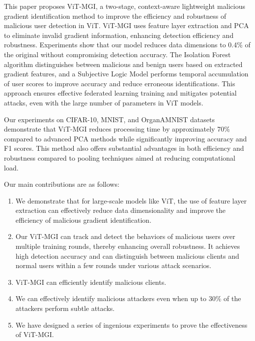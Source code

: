 \documentclass[conference]{IEEEtran}
\begin{document}
This paper proposes ViT-MGI, a two-stage, context-aware lightweight malicious gradient identification method to improve the efficiency and robustness of malicious user detection in ViT. ViT-MGI uses feature layer extraction and PCA to eliminate invalid gradient information, enhancing detection efficiency and robustness. Experiments show that our model reduces data dimensions to 0.4\% of the original without compromising detection accuracy. The Isolation Forest algorithm distinguishes between malicious and benign users based on extracted gradient features, and a Subjective Logic Model performs temporal accumulation of user scores to improve accuracy and reduce erroneous identifications. This approach ensures effective federated learning training and mitigates potential attacks, even with the large number of parameters in ViT models.

Our experiments on CIFAR-10, MNIST, and OrganAMNIST datasets demonstrate that ViT-MGI reduces processing time by approximately 70\% compared to advanced PCA methods while significantly improving accuracy and F1 scores. This method also offers substantial advantages in both efficiency and robustness compared to pooling techniques aimed at reducing computational load.

Our main contributions are as follows:


\begin{enumerate}
    \item We demonstrate that for large-scale models like ViT, the use of feature layer extraction can effectively reduce data dimensionality and improve the efficiency of malicious gradient identification.
    \item Our ViT-MGI can track and detect the behaviors of malicious users over multiple training rounds, thereby enhancing overall robustness. It achieves high detection accuracy and can distinguish between malicious clients and normal users within a few rounds under various attack scenarios.
    \item ViT-MGI can efficiently identify malicious clients.
    \item We can effectively identify malicious attackers even when up to 30\% of the attackers perform subtle attacks.
    \item We have designed a series of ingenious experiments to prove the effectiveness of ViT-MGI.
\end{enumerate}
\end{document}
